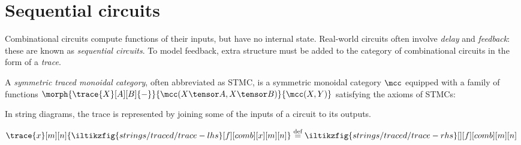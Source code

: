 \section{Sequential circuits}

Combinational circuits compute functions of their inputs, but have no internal
state.
Real-world circuits often involve \emph{delay} and \emph{feedback}: these are
known as \emph{sequential circuits}.
To model feedback, extra structure must be added to the category of
combinational circuits in the form of a \emph{trace}.

\begin{definition}
    \cite{joyal1996traced}
    A \emph{symmetric traced monoidal category}, often abbreviated as STMC, is a
    symmetric monoidal category \(\mcc\) equipped with a family of functions
    \(
        \morph{
            \trace{X}[A][B]{-}
        }{
            \mcc(X \tensor A, X \tensor B)
        }{
            \mcc(X, Y)
        }
    \) satisfying the axioms of STMCs:
\end{definition}

In string diagrams, the trace is represented by joining some of the
inputs of a circuit to its outputs.

\begin{center}
    \(
        \trace{x}[m][n]{\iltikzfig{strings/traced/trace-lhs}[f][comb][x][m][n]}
        \stackrel{\text{def}}{=}
        \iltikzfig{strings/traced/trace-rhs}[][f][comb][m][n]
    \)
\end{center}